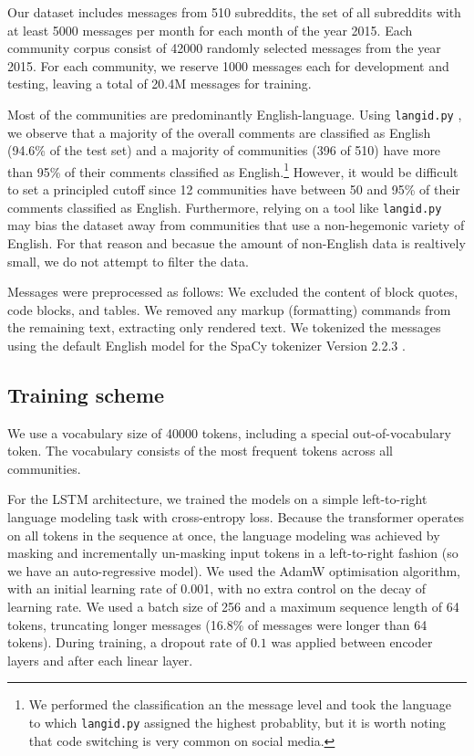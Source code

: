 \documentclass[11pt]{article}
\begin{document}
Our dataset includes messages from \num{510} subreddits, 
the set of all subreddits 
with at least \num{5000} messages per month for each month
of the year 2015.
Each community corpus consist of \num{42000} randomly selected messages from the year 2015.
For each community, we reserve \num{1000} messages each for development and testing,
leaving a total of \num{20.4}M messages for training.

Most of the communities are predominantly English-language.
Using \texttt{langid.py} \citep{Lui2012}, we observe that a majority of the overall
comments are classified as English (94.6\% of the test set) and a majority 
of communities (396 of 510) have more than 95\% of their comments classified as English.\footnote{
  We performed the classification an the message level and took the language to which \texttt{langid.py}
  assigned the highest probablity, but it is worth noting that code switching is very common on social media.}
However, it would be difficult to set a principled cutoff since 12 communities have between
50 and 95\% of their comments classified as English. 
Furthermore, relying on a tool like \texttt{langid.py} may bias 
the dataset away from communities that use a non-hegemonic variety of English.
For that reason and becasue the amount of non-English data is realtively small,
we do not attempt to filter the data. 

Messages were preprocessed as follows:
We excluded the content of block quotes, code blocks, and tables.
We removed any markup (formatting) commands from the remaining text, 
extracting only rendered text.
We tokenized the messages using the default English model for the SpaCy tokenizer 
Version 2.2.3 \citep{Honnibal2017}.


\subsection{Training scheme}

We use a vocabulary size of \num{40000} tokens, including a special
out-of-vocabulary token.  The vocabulary consists of the most frequent
tokens across all communities.

For the LSTM architecture, we trained the models on a simple left-to-right language
modeling task with cross-entropy loss.  Because
the transformer operates on all tokens in the sequence at once, the
language modeling was achieved by masking and incrementally un-masking
input tokens in a left-to-right fashion (so we have an
auto-regressive model).  We used the AdamW
\citep{Loshchilov2019} optimisation algorithm, with an initial
learning rate of \num{0.001}, with no extra control on the decay
of learning rate.
%
We used a batch size of \num{256} and a maximum sequence length of
\num{64} tokens, truncating longer messages (16.8\% of messages were
longer than \num{64} tokens).  During training, a dropout rate of
$0.1$ was applied between encoder layers and after each linear layer.
\end{document}
